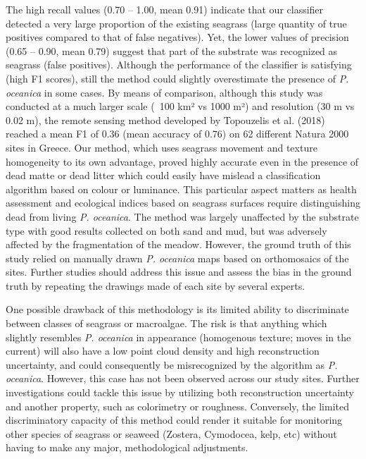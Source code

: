 The high recall values (0.70 – 1.00, mean 0.91) indicate that our classifier detected a very large proportion of the existing seagrass (large quantity of true positives compared to that of false negatives). Yet, the lower values of precision (0.65 – 0.90, mean 0.79) suggest that part of the substrate was recognized as seagrass (false positives). Although the performance of the classifier is satisfying (high F1 scores), still the method could slightly overestimate the presence of \textit{P. oceanica} in some cases. By means of comparison, although this study was conducted at a much larger scale (~100 km² vs 1000 m²) and resolution (30 m vs 0.02 m), the remote sensing method developed by Topouzelis et al. (2018) reached a mean F1 of 0.36 (mean accuracy of 0.76) on 62 different Natura 2000 sites in Greece. Our method, which uses seagrass movement and texture homogeneity to its own advantage, proved highly accurate even in the presence of dead matte or dead litter which could easily have mislead a classification algorithm based on colour or luminance. This particular aspect matters as health assessment and ecological indices based on seagrass surfaces require distinguishing dead from living \textit{P. oceanica}. The method was largely unaffected by the substrate type with good results collected on both sand and mud, but was adversely affected by the fragmentation of the meadow. However, the ground truth of this study relied on manually drawn \textit{P. oceanica} maps based on orthomosaics of the sites. Further studies should address this issue and assess the bias in the ground truth by repeating the drawings made of each site by several experts. 

One possible drawback of this methodology is its limited ability to discriminate between classes of seagrass or macroalgae. The risk is that anything which slightly resembles \textit{P. oceanica} in appearance (homogenous texture; moves in the current) will also have a low point cloud density and high reconstruction uncertainty, and could consequently be misrecognized by the algorithm as \textit{P. oceanica}. However, this case has not been observed across our study sites. Further investigations could tackle this issue by utilizing both reconstruction uncertainty and another property, such as colorimetry or roughness. Conversely, the limited discriminatory capacity of this method could render it suitable for monitoring other species of seagrass or seaweed (Zostera, Cymodocea, kelp, etc) without having to make any major, methodological adjustments.

